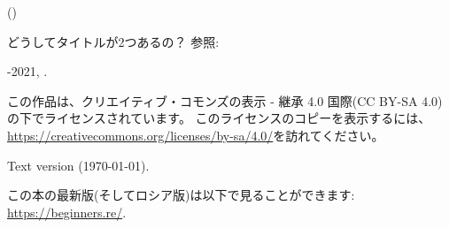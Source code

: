 ﻿\begin{titlepage}


\end{titlepage}

\newpage

\begin{center}
\vspace*{\fill}
{\LARGE \TitleMain}

\bigskip

{\large (\TitleAux)}

\bigskip
\bigskip
どうしてタイトルが2つあるの？ 参照: 

\vspace*{\fill}

{\large \AUTHOR}

{\large \TT{\EMAILPRI}}
\vspace*{\fill}
\vfill

\ccbysa

-2021, \AUTHOR. 

この作品は、クリエイティブ・コモンズの表示 - 継承 4.0 国際(CC BY-SA 4.0)の下でライセンスされています。
このライセンスのコピーを表示するには、\url{https://creativecommons.org/licenses/by-sa/4.0/}を訪れてください。

Text version ({\large \today}).

この本の最新版(そしてロシア版)は以下で見ることができます: \url{https://beginners.re/}.

\end{center}
